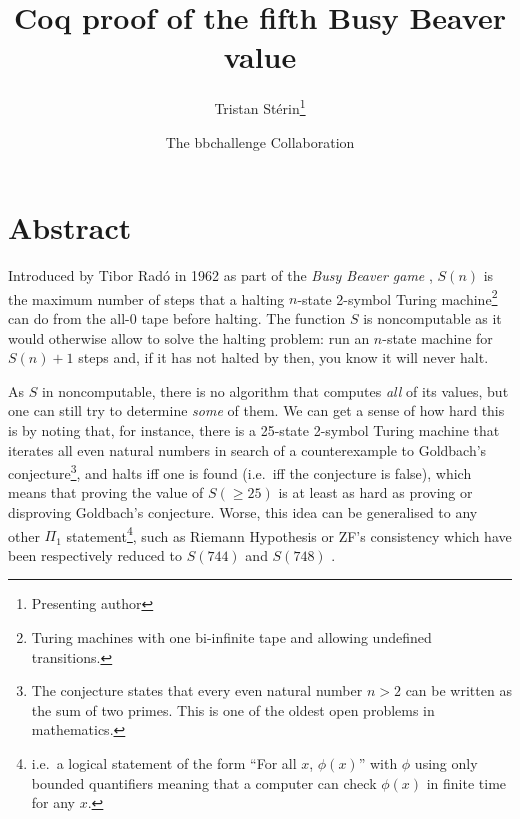 \documentclass{easychair}
\title{Coq proof of the fifth Busy Beaver value}
\author{
  Tristan Stérin\thanks{Presenting author}\inst{~1,2} \and The bbchallenge Collaboration\inst{1}
}
\institute{
  bbchallenge.org,
   \email{bbchallenge@bbchallenge.org}
\and
prgm.dev,
  Paris, France\\
  \email{tristan@prgm.dev}\\
 }
\newcommand{\radofull}{Tibor Rad\'o\xspace}
\theoremstyle{definition} %
\numberwithin{equation}{section}
\theoremstyle{definition} %
\begin{document}
\maketitle

\section*{Abstract}

\newcommand{\ie}{i.e.~}
\newcommand{\eg}{e.g.~}

\newcommand{\noncomput}{noncomputable\xspace}
\newcommand{\BBfull}{Busy Beaver\xspace}
\newcommand{\Coq}{Coq\xspace}
\newcommand{\CoqProofReleaseURL}{\url{https://github.com/ccz181078/Coq-BB5}}


Introduced by \radofull in 1962 as part of the \textit{Busy Beaver game} \cite{Rado_1962}, $S(n)$ is the maximum number of steps that a halting $n$-state 2-symbol Turing machine\footnote{Turing machines with one bi-infinite tape and allowing undefined transitions.} can do from the all-0 tape before halting. The function $S$ is noncomputable as it would otherwise allow to solve the 
halting problem: run an $n$-state machine for $S(n)+1$ steps and, if it has not halted by then, you know it will never halt.

As $S$ in noncomputable, there is no algorithm that computes \textit{all} of its values, but one can still try to determine \textit{some} of them. We can get a sense of how hard this is by noting that, for instance, there is a 25-state 2-symbol Turing machine \cite{GoldbachTM27,GoldbachTM25} that iterates all even natural numbers in search of a counterexample to Goldbach's conjecture\footnote{The conjecture states that every even natural number $n>2$ can be written as the sum of two primes. This is one of the oldest open problems in mathematics.}, and halts iff one is found (\ie iff the conjecture is false), which means that proving the value of $S(\geq 25)$ is at least as hard as proving or disproving Goldbach's conjecture. Worse, this idea can be generalised to any other $\Pi_1$ statement\footnote{\ie a logical statement of the form ``For all $x$, $\phi(x)$'' with $\phi$ using only bounded quantifiers meaning that a computer can check $\phi(x)$ in finite time for any $x$.}, such as Riemann Hypothesis or ZF's consistency which have been respectively reduced to $S(744)$ and $S(748)$ \cite{RiemannTM,Yedidia2016,ZFTM,Yedidia2016,BusyBeaverFrontier,BB748Thesis}. 
\end{document}
